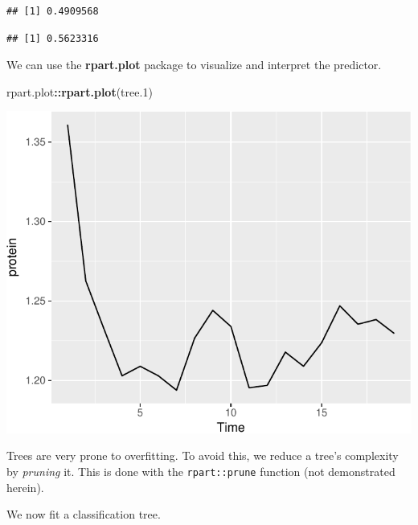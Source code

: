 \documentclass[]{book}
\newenvironment{Shaded}{\begin{snugshade}}{\end{snugshade}}
\newcommand{\KeywordTok}[1]{\textcolor[rgb]{0.13,0.29,0.53}{\textbf{#1}}}
\newcommand{\DataTypeTok}[1]{\textcolor[rgb]{0.13,0.29,0.53}{#1}}
\newcommand{\DecValTok}[1]{\textcolor[rgb]{0.00,0.00,0.81}{#1}}
\newcommand{\StringTok}[1]{\textcolor[rgb]{0.31,0.60,0.02}{#1}}
\newcommand{\CommentTok}[1]{\textcolor[rgb]{0.56,0.35,0.01}{\textit{#1}}}
\newcommand{\OperatorTok}[1]{\textcolor[rgb]{0.81,0.36,0.00}{\textbf{#1}}}
\newcommand{\NormalTok}[1]{#1}
\theoremstyle{definition}
\theoremstyle{definition}
\theoremstyle{definition}
\theoremstyle{remark}
\begin{document}
\begin{verbatim}
## [1] 0.4909568
\end{verbatim}

\begin{Shaded}
\end{Shaded}

\begin{verbatim}
## [1] 0.5623316
\end{verbatim}

We can use the \textbf{rpart.plot} package to visualize and interpret
the predictor.

\begin{Shaded}
\begin{Highlighting}[]
\NormalTok{rpart.plot}\OperatorTok{::}\KeywordTok{rpart.plot}\NormalTok{(tree.}\DecValTok{1}\NormalTok{)}
\end{Highlighting}
\end{Shaded}

\includegraphics[width=0.5\linewidth]{Rcourse_files/figure-latex/unnamed-chunk-244-1}

Trees are very prone to overfitting. To avoid this, we reduce a tree's
complexity by \emph{pruning} it. This is done with the
\texttt{rpart::prune} function (not demonstrated herein).

We now fit a classification tree.

\begin{Shaded}
\end{Shaded}
\end{document}
